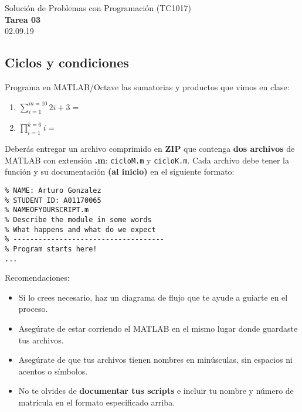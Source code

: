 \documentclass[]{book}
\theoremstyle{definition}
\newcommand{\textdf}[1]{\textbf{\textsf{#1}}\index{#1}}
\begin{document}
\begin{center}
{\huge Solución de Problemas con Programación (TC1017)}\\[1.5ex]
{\large \textbf{Tarea 03}\\[1.5ex] %
02.09.19} %
\end{center}

\vspace{0.2 cm}

\subsection*{Ciclos y condiciones}

Programa en MATLAB/Octave las sumatorias y productos que vimos en clase:

\begin{enumerate}[label=\alph*)]
    \itemsep2.5ex
    \item {\Large $\sum \limits_{i=1}^{m=10} 2i + 3 =$}
    \item {\Large $\prod \limits_{i=1}^{k=6} i =$}
\end{enumerate}

\bigskip

Deberás entregar un archivo comprimido en \textbf{ZIP} que contenga \textbf{dos archivos} de MATLAB con extensión \textbf{.m}:
\texttt{cicloM.m} y \texttt{cicloK.m}.
Cada archivo debe tener la función y su documentación \textdf{(al inicio)} en el siguiente formato:

\bigskip

\begin{lstlisting}[style=Matlab-editor]
% ------------------------------------
% NAME: Arturo Gonzalez
% STUDENT ID: A01170065
% NAMEOFYOURSCRIPT.m
% Describe the module in some words
% What happens and what do we expect
% ------------------------------------
% Program starts here!
...
\end{lstlisting}

\bigskip

{\Large Recomendaciones:}
\begin{itemize}
    \item Si lo crees necesario, haz un diagrama de flujo que te ayude a guiarte en el proceso.
    \item Asegúrate de estar corriendo el MATLAB en el mismo lugar donde guardaste tus archivos.
    \item Asegúrate de que tus archivos tienen nombres en minúsculas, sin espacios ni acentos o símbolos. 
    \item No te olvides de \textbf{documentar tus scripts} e incluir tu nombre y número de matrícula en el formato especificado arriba.
\end{itemize}
\end{document}

